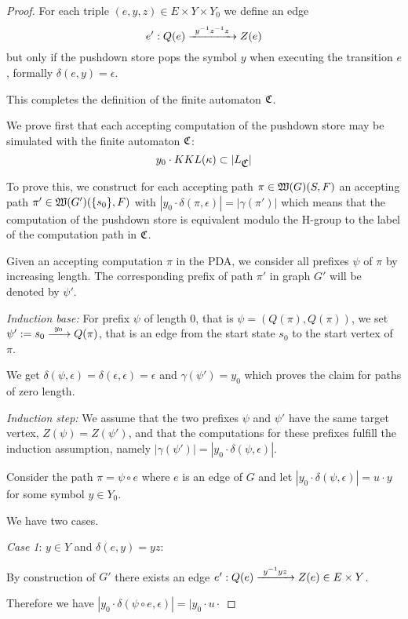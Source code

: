 \begin{proof}
For each triple $(e, y, z) \in E \times Y
\times Y_0$ we define an edge
\[ e': Q(e) \xrightarrow{\ {y^{-1} z^{-1} z}\ } Z(e) \]
but only if the pushdown store pops the symbol $y$ when executing the transition
$e$, formally $\delta(e, y) = \epsilon$.

\bigskip
This completes the definition of the finite automaton $\mbox{$\mathfrak{C}$}$.

We prove first that each accepting computation of the pushdown store may be
simulated with the finite automaton $\mbox{$\mathfrak{C}$}$:
\[ y_0 \cdot KKL(\kappa) \subset |L_{\mbox{$\mathfrak{C}$}}| \]

To prove this, we construct for each accepting path $\pi \in
\mbox{$\mathfrak{W}(G)$}(S,F)$ an accepting path $\pi' \in
\mbox{$\mathfrak{W}(G')$}(\mbox{$\{s_0\}$}, F)$ with $|y_0 \cdot \delta(\pi, \epsilon)| = |\gamma(\pi')|$ 
which means that the computation of the pushdown store is equivalent modulo the
H-group to the label of the computation path in $\mbox{$\mathfrak{C}$}$.

Given an accepting computation $\pi$ in the PDA, we consider all prefixes
$\psi$ of $\pi$ by increasing length. The corresponding prefix of path $\pi'$ in
graph $G'$ will be denoted by $\psi'$.

{\em Induction base:} For prefix $\psi$ of length 0, that is $\psi =
(Q(\pi), Q(\pi))$, we set $\psi' := s_0 \xrightarrow{\ {y_0}\ } Q(\pi)$, that
is an edge from the start state $s_0$ to the start vertex of $\pi$. 

We get $\delta(\psi, \epsilon) = \delta(\epsilon, \epsilon) = \epsilon$ and
$\gamma(\psi') = y_0$ which proves the claim for paths of zero length.

{\em Induction step:} We assume that the two prefixes $\psi$ and $\psi'$ have
the same target vertex, $Z(\psi) = Z(\psi')$, and that the computations for
these prefixes fulfill the induction assumption, namely $|\gamma(\psi')| =
|y_0 \cdot \delta(\psi, \epsilon)|$.

Consider the path $\pi = \psi \circ e$ where $e$ is an edge of $G$ and let
$|y_0 \cdot \delta(\psi, \epsilon)| = u \cdot y$ for some symbol $y \in Y_0$.

We have two cases.

{\em Case 1}: $y \in Y$ and $\delta(e, y) = y z$:

By construction of $G'$ there exists an edge $e': Q(e) \xrightarrow{\ {y^{-1} y z}\ } Z(e)
\in E \times Y$.

Therefore we have $|y_0 \cdot \delta(\psi \circ e, \epsilon)| = |y_0 \cdot u
\cdot$




\end{proof}




























